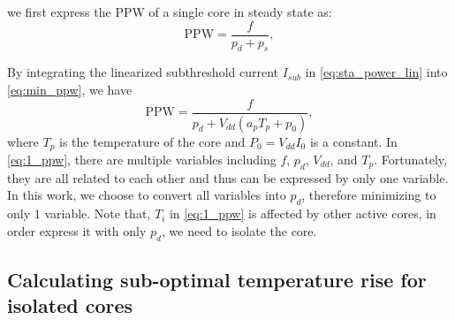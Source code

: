 

we first express the PPW of a single core in steady state as:
\begin{equation}\label{eq:min_ppw}
\text{PPW}=\frac{f}{p_{d}+p_{s}},
\end{equation}

By integrating the linearized subthreshold current $I_{sub}$ in \eqref{eq:sta_power_lin} into \eqref{eq:min_ppw}, we have
\begin{equation}\label{eq:1_ppw}
\text{PPW} = \frac{f}{p_{d}+V_{dd}(a_pT_p+p_{0})},
\end{equation}
where $T_p$ is the temperature of the core and $P_{0} = V_{dd}I_0$ is
a constant. In \eqref{eq:1_ppw}, there are multiple variables
including $f$, $p_{d}$, $V_{dd}$, and $T_p$. Fortunately, they are all
related to each other and thus can be expressed by only one
variable. In this work, we choose to convert all variables into $p_{d}$, therefore minimizing to only $1$ variable. Note that, $T_{i}$ in \eqref{eq:1_ppw} is affected by other active cores, in order express it with only $p_{d}$, we need to isolate the core.


\subsection{Calculating sub-optimal temperature rise for isolated cores}

